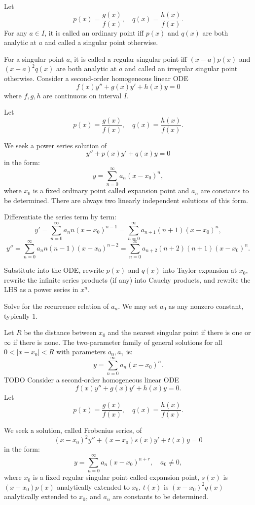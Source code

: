 \documentclass[a4paper,12pt]{report}
\begin{document}
Let
\[p(x)=\frac{g(x)}{f(x)},\quad q(x)=\frac{h(x)}{f(x)}.\]
For any $a\in I$, it is called an ordinary point iff $p(x)$ and $q(x)$ are both analytic at $a$ and called a singular point otherwise.

For a singular point $a$, it is called a regular singular point iff $(x-a)p(x)$ and $(x-a)^2q(x)$ are both analytic at $a$ and called an irregular singular point otherwise.
Consider a second-order homogeneous linear ODE
\[f(x)y''+g(x)y'+h(x)y=0\]
where $f,g,h$ are continuous on interval $I$.

Let
\[p(x)=\frac{g(x)}{f(x)},\quad q(x)=\frac{h(x)}{f(x)}.\]
\ben
\item We seek a power series solution of
\[y''+p(x)y'+q(x)y=0\]
in the form:
\[y=\sum_{n=0}^{\infty}a_n(x-x_0)^n,\]
where $x_0$ is a fixed ordinary point called expansion point and $a_n$ are constants to be determined. There are always two linearly independent solutions of this form.
\item Differentiate the series term by term:
\[y'=\sum_{n=0}^{\infty}a_nn(x-x_0)^{n-1}=\sum_{n=0}^{\infty}a_{n+1}(n+1)(x-x_0)^n,\]
\[y''=\sum_{n=0}^{\infty}a_nn(n-1)(x-x_0)^{n-2}=\sum_{n=0}^{\infty}a_{n+2}(n+2)(n+1)(x-x_0)^n.\]
\item Substitute into the ODE, rewrite $p(x)$ and $q(x)$ into Taylor expansion at $x_0$, rewrite the infinite series products (if any) into Cauchy products, and rewrite the LHS as a power series in $x^n$.
\item Solve for the recurrence relation of $a_n$. We may set $a_0$ as any nonzero constant, typically 1.
\item Let $R$ be the distance between $x_0$ and the nearest singular point if there is one or $\infty$ if there is none. The two-parameter family of general solutions for all $0<|x-x_0|<R$ with parameters $a_0,a_1$ is:
\[y=\sum_{n=0}^{\infty}a_n(x-x_0)^n.\]
\een
\bpr
TODO
\epr
{}
Consider a second-order homogeneous linear ODE
\[f(x)y''+g(x)y'+h(x)y=0.\]
Let
\[p(x)=\frac{g(x)}{f(x)},\quad q(x)=\frac{h(x)}{f(x)}.\]
\ben
\item We seek a solution, called Frobenius series, of
\[(x-x_0)^2y''+(x-x_0)s(x)y'+t(x)y=0\]
in the form:
\[y=\sum_{n=0}^{\infty}a_n(x-x_0)^{n+r},\quad a_0\neq 0,\]
where $x_0$ is a fixed regular singular point called expansion point, $s(x)$ is $(x-x_0)p(x)$ analytically extended to $x_0$, $t(x)$ is $(x-x_0)^2q(x)$ analytically extended to $x_0$, and $a_n$ are constants to be determined.
\end{document}
